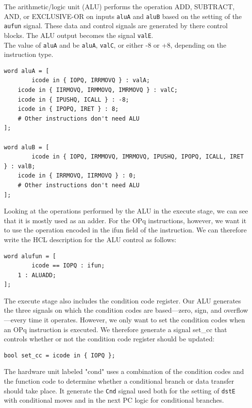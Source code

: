 \documentclass[11pt]{article}
\begin{document}
\begin{enumerate}
The arithmetic/logic unit (ALU) performs the operation ADD, SUBTRACT, AND, or EXCLUSIVE-OR on inputs \texttt{aluA} and \texttt{aluB} based on the setting of the \texttt{aufun} signal. These data and control signals are generated by there control blocks. The ALU output becomes the signal \texttt{valE}.\\

The value of \texttt{aluA} and be \texttt{aluA}, \texttt{valC}, or either -8 or +8, depending on the instruction type.\\

\begin{verbatim}
word aluA = [
        icode in { IOPQ, IRRMOVQ } : valA;
	icode in { IIRMOVQ, IRMMOVQ, IMRMOVQ } : valC;
	icode in { IPUSHQ, ICALL } : -8;
	icode in { IPOPQ, IRET } : 8;
	# Other instructions don't need ALU
];

word aluB = [
        icode in { IOPQ, IRMMOVQ, IMRMOVQ, IPUSHQ, IPOPQ, ICALL, IRET } : valB;
	icode in { IRRMOVQ, IIRMOVQ } : 0;
	# Other instructions don't need ALU
];
\end{verbatim}

Looking at the operations performed by the ALU in the execute stage, we can see that it is mostly used as an adder. For the OPq instructions, however, we want it to use the operation encoded in the ifun field of the instruction. We can therefore write the HCL description for the ALU control as follows:\\
\begin{verbatim}
word alufun = [
        icode == IOPQ : ifun;
	1 : ALUADD;
];
\end{verbatim}


The execute stage also includes the condition code register. Our ALU generates the three signals on which the condition codes are based—zero, sign, and overflow—every time it operates. However, we only want to set the condition codes when an OPq instruction is executed. We therefore generate a signal set\_cc that controls whether or not the condition code register should be updated:\\
\begin{verbatim}
bool set_cc = icode in { IOPQ };
\end{verbatim}

The hardware unit labeled "cond" uses a combination of the condition codes and the function code to determine whether a conditional branch or data transfer should take place. It generate the \texttt{Cnd} signal used both for the setting of \texttt{dstE} with conditional moves and in the next PC logic for conditional branches.\\


\end{enumerate}
\end{document}
